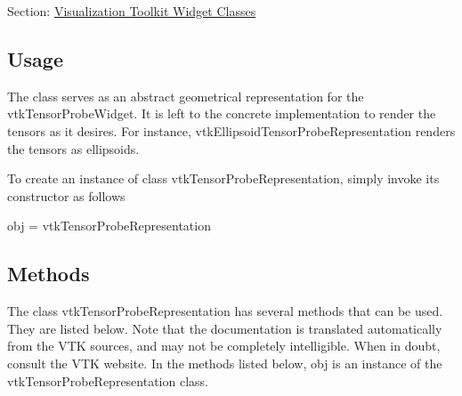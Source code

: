 Section\-: \hyperlink{sec_vtkwidgets}{Visualization Toolkit Widget Classes} \hypertarget{vtkwidgets_vtkxyplotwidget_Usage}{}\subsection{Usage}\label{vtkwidgets_vtkxyplotwidget_Usage}
The class serves as an abstract geometrical representation for the vtk\-Tensor\-Probe\-Widget. It is left to the concrete implementation to render the tensors as it desires. For instance, vtk\-Ellipsoid\-Tensor\-Probe\-Representation renders the tensors as ellipsoids.

To create an instance of class vtk\-Tensor\-Probe\-Representation, simply invoke its constructor as follows \begin{DoxyVerb}  obj = vtkTensorProbeRepresentation
\end{DoxyVerb}
 \hypertarget{vtkwidgets_vtkxyplotwidget_Methods}{}\subsection{Methods}\label{vtkwidgets_vtkxyplotwidget_Methods}
The class vtk\-Tensor\-Probe\-Representation has several methods that can be used. They are listed below. Note that the documentation is translated automatically from the V\-T\-K sources, and may not be completely intelligible. When in doubt, consult the V\-T\-K website. In the methods listed below, {\ttfamily obj} is an instance of the vtk\-Tensor\-Probe\-Representation class. 
